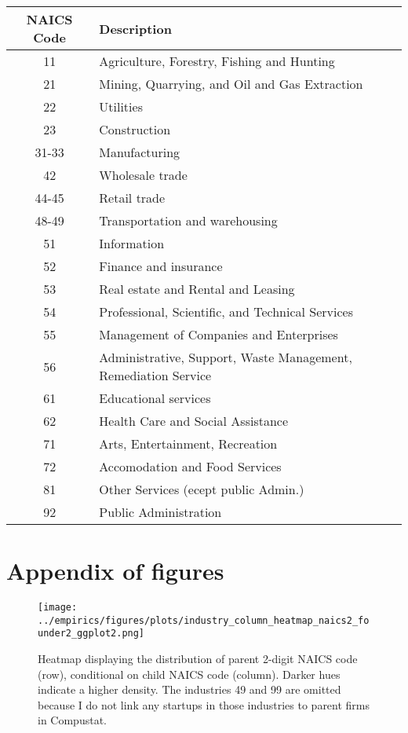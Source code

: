 \documentclass[ecta,nameyear,final]{econsocart}
\theoremstyle{definition}
\begin{document}
\begin{table}[]
	\small
	\centering
	\begin{tabular}{cl}
		\toprule \toprule
		NAICS Code & Description \tabularnewline
		\midrule
		11  & Agriculture, Forestry, Fishing and Hunting \tabularnewline
		21  & Mining, Quarrying, and Oil and Gas Extraction\tabularnewline
		22  & Utilities\tabularnewline
		23  & Construction \tabularnewline
		31-33 & Manufacturing \tabularnewline
		42 & Wholesale trade \tabularnewline
		44-45 & Retail trade \tabularnewline
		48-49 & Transportation and warehousing \tabularnewline
		51 & Information \tabularnewline
		52 & Finance and insurance \tabularnewline
		53 & Real estate and Rental and Leasing \tabularnewline
		54 & Professional, Scientific, and Technical Services \tabularnewline
		55 & Management of Companies and Enterprises \tabularnewline
		56 & Administrative, Support, Waste Management, Remediation Service \tabularnewline
		61 & Educational services \tabularnewline
		62 & Health Care and Social Assistance \tabularnewline
		71 & Arts, Entertainment, Recreation \tabularnewline
		72 & Accomodation and Food Services \tabularnewline
		81 & Other Services (ecept public Admin.) \tabularnewline
		92 & Public Administration\tabularnewline
		\bottomrule
	\end{tabular}
	\label{naics2_codes}	
\end{table}





\newpage
\section{Appendix of figures}

\setcounter{figure}{0}
\renewcommand{\thefigure}{\Alph{section}\arabic{figure}}

\begin{figure}[!htb]
	\centering
	\texttt{[image: ../empirics/figures/plots/industry\_column\_heatmap\_naics2\_founder2\_ggplot2.png]}
	\caption{Heatmap displaying the distribution of parent 2-digit NAICS code (row), conditional on child NAICS code (column). Darker hues indicate a higher density. The industries 49 and 99 are omitted because I do not link any startups in those industries to parent firms in Compustat.}
	\label{figure:industry_column_heatmap_naics2_founder2}
\end{figure}
\end{document}
